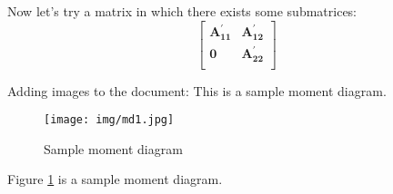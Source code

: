 Now let's try a matrix in which there exists some submatrices:
\begin{equation*}
	\begin{bmatrix}
		\bm{A_{11}^{'}} & \bm{A_{12}^{'}} \\
		\bm{0} & \bm{A_{22}^{'}} \\
	\end{bmatrix}
\end{equation*}

Adding images to the document: This is a sample moment diagram.
\begin{figure}
	\texttt{[image: img/md1.jpg]}
	\centering
	\caption{Sample moment diagram}
	\label{fig:md1}
\end{figure}
Figure \ref{fig:md1} is a sample moment diagram.

